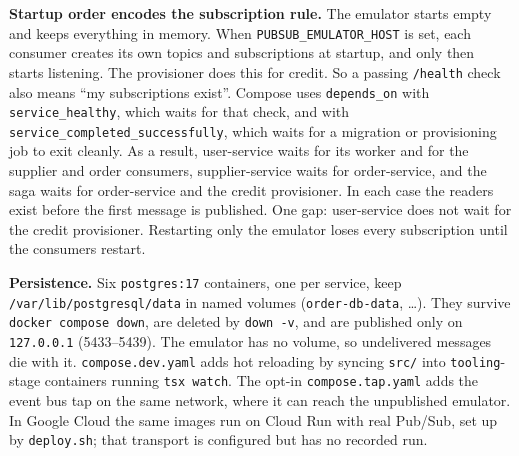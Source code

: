 \documentclass[11pt,a4paper]{article}
\newcommand{\code}[1]{\nolinkurl{#1}}
\begin{document}
\textbf{Startup order encodes the subscription rule.} The emulator starts empty and keeps
everything in memory. When \code{PUBSUB_EMULATOR_HOST} is set, each consumer creates its own
topics and subscriptions at startup, and only then starts listening. The provisioner does this
for credit. So a passing \code{/health} check also means ``my subscriptions exist''. Compose uses
\code{depends_on} with \code{service_healthy}, which waits for that check, and with
\code{service_completed_successfully}, which waits for a migration or provisioning job to exit
cleanly. As a result, user-service waits for its worker and for the supplier and order
consumers, supplier-service waits for order-service, and the saga waits for order-service and
the credit provisioner. In each case the readers exist before the first message is published.
One gap: user-service does not wait for the credit provisioner. Restarting only the emulator
loses every subscription until the consumers restart.

\textbf{Persistence.} Six \code{postgres:17} containers, one per service, keep
\code{/var/lib/postgresql/data} in named volumes (\code{order-db-data}, \ldots). They survive
\code{docker compose down}, are deleted by \code{down -v}, and are published only on
\code{127.0.0.1} (5433--5439). The emulator has no volume, so undelivered messages die with it.
\code{compose.dev.yaml} adds hot reloading by syncing \code{src/} into \code{tooling}-stage
containers running \code{tsx watch}. The opt-in \code{compose.tap.yaml} adds the event bus tap
on the same network, where it can reach the unpublished emulator. In Google Cloud the same images
run on Cloud Run with real Pub/Sub, set up by \code{deploy.sh}; that transport is configured but
has no recorded run.
\end{document}
